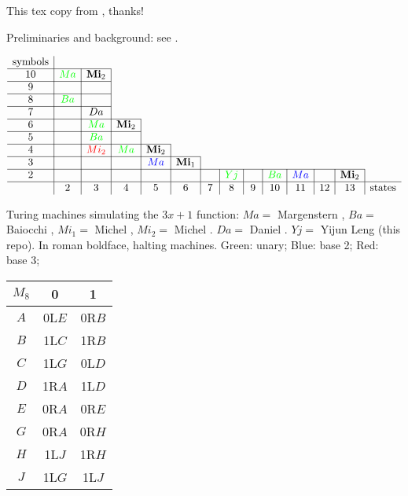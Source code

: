 \documentclass[10pt]{article}
\date{Feburary 23, 2025}
\begin{document}
This tex copy from \cite{Mi14}, thanks!

Preliminaries and background: see \cite{Mi14}.

\begin{table}
$$\begin{array}{c|c|c|c|c|c|c|c|c|c|c|c|c|c}
\mbox{symbols} & \multicolumn{13}{c}{}\\                                                \cline{1-3}
10             & \textcolor{green}{Ma}    & \mbox{\bf Mi}_2& \multicolumn{11}{c}{}\\                       \cline{1-3}
9              &       &      &\multicolumn{11}{c}{}\\                                  \cline{1-3}
8              & \textcolor{green}{Ba}    &      &\multicolumn{11}{c}{}\\                                  \cline{1-3}
7              &       & Da   			 &\multicolumn{11}{c}{}\\                                  \cline{1-4}
6              &       & \textcolor{green}{Ma}   &  \mbox{\bf Mi}_2 & \multicolumn{10}{c}{}\\          \cline{1-4}
5              &       & \textcolor{green}{Ba}   &                  & \multicolumn{10}{c}{}\\          \cline{1-5}
4              &       & \textcolor{red}{Mi_2} & \textcolor{green}{Ma}               &\mbox{\bf Mi}_2 & \multicolumn{9}{c}{}\\         \cline{1-6}
3              &       &      &                  & \textcolor{blue}{Ma}   &\mbox{\bf Mi}_1 & \multicolumn{8}{c}{}\\  \cline{1-13}
2              &       &      &    &      &      &     & \textcolor{green}{Yj}   &   & \textcolor{green}{Ba}  & \textcolor{blue}{Ma} & & \mbox{\bf Mi}_2\\  \hline
               & 2     & 3    & 4  & 5    &\,6\, &\,7\,&\,8\,&\,9\,& 10  & 11 & 12 & 13 & \mbox{states}
\end{array}$$
\caption{Turing machines simulating the $3x + 1$ function:
$Ma=$ Margenstern \cite{Ma98,Ma00},
$Ba=$ Baiocchi \cite{Ba98},
$Mi_1=$ Michel \cite{Mi93},
$Mi_2=$ Michel \cite{Mi14}.
$Da=$ Daniel \cite{Da24}.
$Yj=$ Yijun Leng (this repo).
In roman boldface, halting machines.
Green: unary;
Blue: base 2;
Red: base 3;
}
\end{table}


\begin{center}
\begin{tabular}{|c|c|c|}
\hline
$M_8$ &  0  &   1   \\
\hline
$A$ & 0L$E$ & 0R$B$ \\
\hline
$B$ & 1L$C$ & 1R$B$ \\
\hline
$C$ & 1L$G$ & 0L$D$ \\
\hline
$D$ & 1R$A$ & 1L$D$ \\
\hline
$E$ & 0R$A$ & 0R$E$ \\
\hline
$G$ & 0R$A$ & 0R$H$ \\
\hline
$H$ & 1L$J$ & 1R$H$ \\
\hline
$J$ & 1L$G$ & 1L$J$ \\
\hline
\end{tabular}
\end{center}
\end{document}
